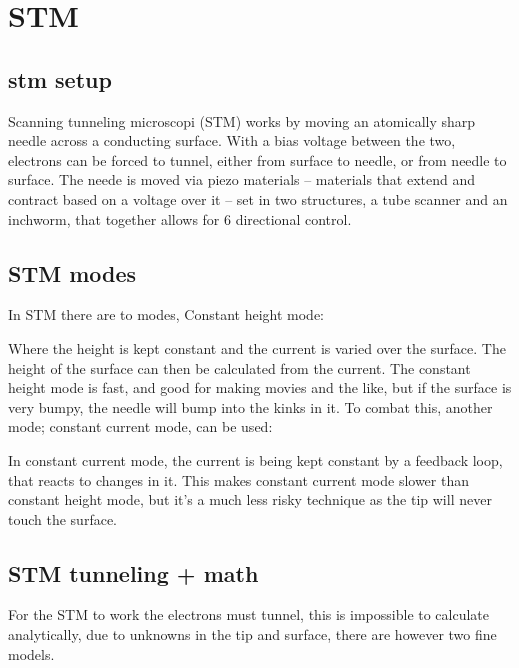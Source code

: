 \documentclass[article,oneside]{memoir}
\begin{document}
\chapter{STM}
\section{stm setup}

Scanning tunneling microscopi (STM) works by moving an atomically sharp needle across a conducting surface. With a bias voltage between the two, electrons can be forced to tunnel, either from surface to needle, or from needle to surface. The neede is moved via piezo materials -- materials that extend and contract based on a voltage over it -- set in two structures, a tube scanner and an inchworm, that together allows for 6 directional control. 
\section{STM modes}
In STM there are to modes, Constant height mode:


Where the height is kept constant and the current is varied over the surface. The height of the surface can then be calculated from the current. The constant height mode is fast, and good for making movies and the like, but if the surface is very bumpy, the needle will bump into the kinks in it. To combat this, another mode; constant current mode, can be used:


In constant current mode, the current is being kept constant by a feedback loop, that reacts to changes in it. This makes constant current mode slower than constant height mode, but it's a much less risky technique as the tip will never touch the surface.

\section{STM tunneling + math}
For the STM to work the electrons must tunnel, this is impossible to calculate analytically, due to unknowns in the tip and surface, there are however two fine models.
\end{document}
